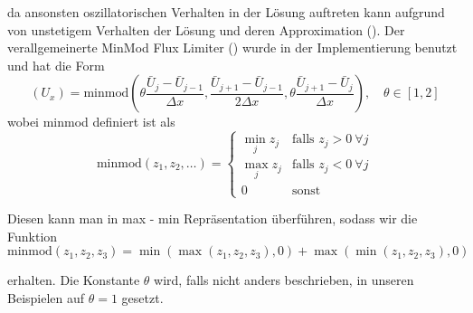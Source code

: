 da ansonsten oszillatorischen Verhalten in der Lösung auftreten kann aufgrund von unstetigem Verhalten der Lösung und deren Approximation (\cite[Abschnitt 6.6]{leveque2002finite}).
Der verallgemeinerte MinMod Flux Limiter (\cite[(4.9)]{kurganov2000new}) wurde in der Implementierung benutzt und hat die Form
\[
 \left(U_x\right) = \text{minmod}\left(\theta \frac{\bar U_j- \bar U_{j-1}}{\Delta x},\frac{\bar U_{j+1}- \bar U_{j-1}}{2\Delta x},\theta\frac{ \bar U_{j+1}- \bar U_{j}}{\Delta x}  \right), \quad \theta \in [1,2]
\]
wobei minmod definiert ist als
\[
 \text{minmod}(z_1,z_2,\ldots) = \begin{cases}
                                  \min_j z_j & \text{falls }z_j>0~\forall j\\
                                  \max_j z_j & \text{falls }z_j<0~\forall j\\
                                  0 & \text{sonst}
                                 \end{cases}
 \]
 
Diesen kann man in max - min Repräsentation überführen, sodass wir die Funktion
 \begin{equation}
\text{minmod}(z_1,z_2,z_3) = \min(\max(z_1,z_2,z_3),0) + \max(\min(z_1,z_2,z_3),0)    
 \end{equation}

erhalten. Die Konstante $\theta$ wird, falls nicht anders beschrieben, in unseren Beispielen auf $\theta=1$ gesetzt.

